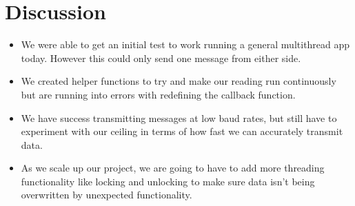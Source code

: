 \documentclass{article}
\begin{document}
\section*{Discussion}
\begin{itemize}
    \item We were able to get an initial test to work running a general multithread app today. However this could only send one message from either side.
    \item We created helper functions to try and make our reading run continuously but are running into errors with redefining the callback function.
    \item We have success transmitting messages at low baud rates, but still have to experiment with our ceiling in terms of how fast we can accurately transmit data.
    \item As we scale up our project, we are going to have to add more threading functionality like locking and unlocking to make sure 
    data isn't being overwritten by unexpected functionality.
\end{itemize}

\end{document}

